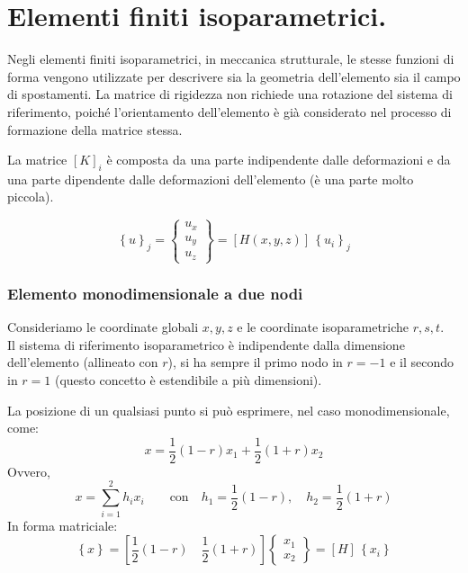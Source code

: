 \section{Elementi finiti isoparametrici.}

\begin{definizioneBox}
    Negli elementi finiti isoparametrici, in meccanica strutturale, le stesse funzioni di forma vengono utilizzate per descrivere sia la geometria dell'elemento sia il campo di spostamenti.
La matrice di rigidezza non richiede una rotazione del sistema di riferimento, poiché l'orientamento dell'elemento è già considerato nel processo di formazione della matrice stessa.
\end{definizioneBox}

La matrice $[K]_i$ è composta da una parte indipendente dalle deformazioni e da una parte dipendente dalle deformazioni dell'elemento (è una parte molto piccola). 

\begin{equation*}
    \left\{u \right\}_j = \begin{Bmatrix}
        u_x\\u_y\\u_z 
    \end{Bmatrix}= [H(x,y,z)] \,\left\{u_i \right\}_j
\end{equation*}

\subsubsection*{Elemento monodimensionale a due nodi}
 Consideriamo le coordinate globali $x,y,z$ e le coordinate isoparametriche $r,s,t$.\\
 Il sistema di riferimento isoparametrico è indipendente dalla dimensione dell'elemento (allineato con $r$), si ha sempre il primo nodo in $r=-1$ e il secondo in $r=1$ (questo concetto è estendibile a più dimensioni).
 
La posizione di un qualsiasi punto si può esprimere, nel caso monodimensionale, come:
\begin{equation*}
    x=\frac{1}{2}(1-r)x_1+\frac{1}{2}(1+r)x_2
\end{equation*}
Ovvero,
\begin{equation*}
    x=\sum^2_{i=1} h_ix_i \qquad \text{con} \quad h_1=\frac{1}{2}(1-r), \quad  h_2=\frac{1}{2}(1+r)
\end{equation*}
In forma matriciale:
\begin{equation*}
    \left\{x \right\} = \left[\frac{1}{2}(1-r) \quad  \frac{1}{2}(1+r)\right]\begin{Bmatrix}
        x_1\\x_2
    \end{Bmatrix}= [H] \,\left\{x_i \right\}
\end{equation*}

